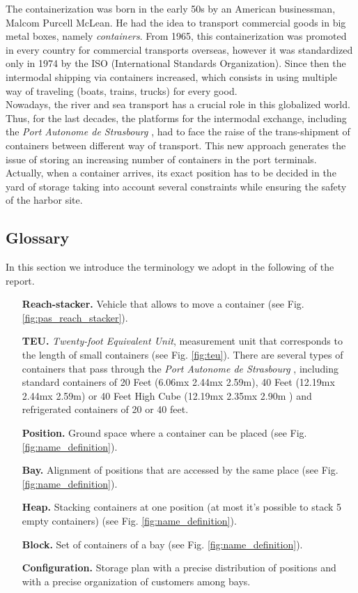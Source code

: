 \documentclass{article}
\newcommand{\PAS}{\emph{Port Autonome de Strasbourg }}
\begin{document}
The containerization was born in the early 50s by an American businessman, Malcom Purcell McLean.
He had the idea to transport commercial goods in big metal boxes, namely \textit{containers}.
From 1965, this containerization was promoted in every country for commercial transports overseas, however it was standardized only in 1974 by the ISO (International Standards Organization).
Since then the intermodal shipping via containers increased, which consists in using multiple way of traveling (boats, trains, trucks) for every good. \\
Nowadays, the river and sea transport has a crucial role in this globalized world.
Thus, for the last decades, the platforms for the intermodal exchange, including the \PAS, had to face the raise of the trans-shipment of containers between different way of transport. 
This new approach generates the issue of storing an increasing number of containers in the port terminals. 
Actually, when a container arrives, its exact position has to be decided in the yard of storage taking into account several constraints while ensuring the safety of the harbor site. 


\subsection{Glossary}
In this section we introduce the terminology we adopt in the following of the report. \\
\begin{itemize}[leftmargin=2.8cm]
	\item[\textbf{Reach-stacker.}] Vehicle that allows to move a container (see Fig. \ref{fig:pas_reach_stacker}).
	\item[\textbf{TEU.}] \textit{Twenty-foot Equivalent Unit},  measurement unit that corresponds to the length of small containers (see Fig. \ref{fig:teu}). 
	There are several types of containers that pass through the \PAS, including standard containers of 20 Feet (6.06mx 2.44mx 2.59m), 40 Feet (12.19mx 2.44mx 2.59m) or 40 Feet High Cube (12.19mx 2.35mx 2.90m ) and refrigerated containers of 20 or 40 feet.
	\item[\textbf{Position.}] Ground space where a container can be placed (see Fig. \ref{fig:name_definition}).
	\item [\textbf{Bay.}] Alignment of positions that are accessed by the same place (see Fig. \ref{fig:name_definition}). \\
	\item [\textbf{Heap.}] Stacking containers at one position (at most it's possible to stack 5 empty containers) (see Fig. \ref{fig:name_definition}). \\
	\item [\textbf{Block.}] Set of containers of a bay (see Fig. \ref{fig:name_definition}). \\
	\item [\textbf{Configuration.}] Storage plan with a precise distribution of positions and with a precise organization of customers among bays.
\end{itemize}
\end{document}
